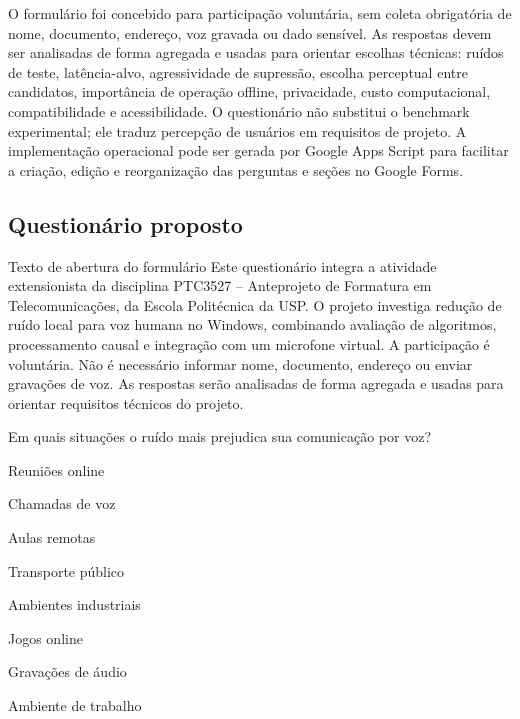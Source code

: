 O formulário foi concebido para participação voluntária, sem coleta obrigatória de nome, documento, endereço, voz gravada ou dado sensível. As respostas devem ser analisadas de forma agregada e usadas para orientar escolhas técnicas: ruídos de teste, latência-alvo, agressividade de supressão, escolha perceptual entre candidatos, importância de operação offline, privacidade, custo computacional, compatibilidade e acessibilidade. O questionário não substitui o benchmark experimental; ele traduz percepção de usuários em requisitos de projeto. A implementação operacional pode ser gerada por Google Apps Script para facilitar a criação, edição e reorganização das perguntas e seções no Google Forms.

\subsection{Questionário proposto}

\setcounter{pergunta}{0}

\begin{blocoFormulario}{Texto de abertura do formulário}
\small
Este questionário integra a atividade extensionista da disciplina PTC3527 -- Anteprojeto de Formatura em Telecomunicações, da Escola Politécnica da USP. O projeto investiga redução de ruído local para voz humana no Windows, combinando avaliação de algoritmos, processamento causal e integração com um microfone virtual. A participação é voluntária. Não é necessário informar nome, documento, endereço ou enviar gravações de voz. As respostas serão analisadas de forma agregada e usadas para orientar requisitos técnicos do projeto.
\end{blocoFormulario}


\begin{perguntaFormulario}{Em quais situações o ruído mais prejudica sua comunicação por voz?}
\begin{opcoesFormularioDuasColunas}
    \item Reuniões online
    \item Chamadas de voz
    \item Aulas remotas
    \item Transporte público
    \item Ambientes industriais
    \item Jogos online
    \item Gravações de áudio
    \item Ambiente de trabalho
\end{opcoesFormularioDuasColunas}
\end{perguntaFormulario}

